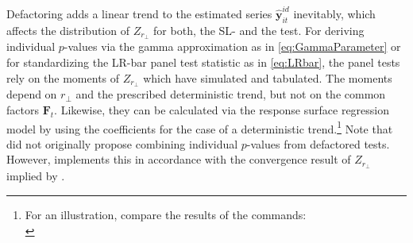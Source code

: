 Defactoring adds a linear trend to the estimated series $ \boldsymbol{\hat{y}}^{i \! d}_{it} $ inevitably, which affects the distribution of $ Z_{r_\perp} $ for both, the SL- and the \citeauthor{Johansen1988} test. For deriving individual $p$-values via the gamma approximation as in \eqref{eq:GammaParameter} or for standardizing the LR-bar panel test statistic as in \eqref{eq:LRbar}, the panel tests rely on the moments of $ Z_{r_\perp} $ which \citet[Appendix, Tab.~A.1]{ArsovaOersal2018} have simulated and tabulated. The moments depend on $ r_\perp $ and the prescribed deterministic trend, but not on the common factors $ \boldsymbol{F}_t $. Likewise, they can be calculated via the response surface regression model by \citet{Trenkler2008} using the coefficients for the case of a deterministic trend.\footnote{For an illustration, compare the results of the  commands:\\ }
Note that \citet{OersalArsova2017} did not originally propose combining individual $p$-values from defactored \citeauthor{Johansen1988} tests. However,  implements this in accordance with the convergence result of $ Z_{r_\perp} $ implied by \citet[p.~1041, Th.~3.4]{ArsovaOersal2018}. 


